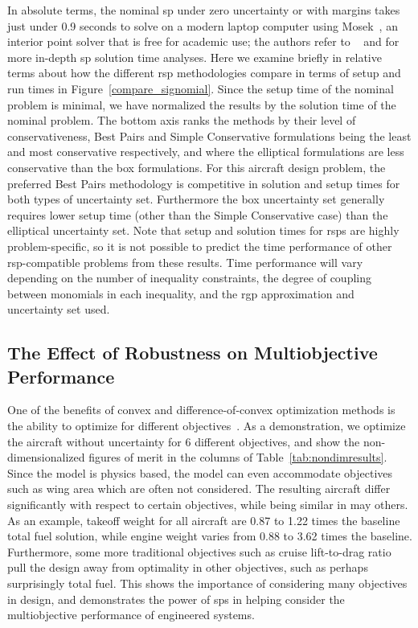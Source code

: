 In absolute
terms, the nominal \gls{sp} under zero uncertainty or with margins
takes just under 0.9 seconds to solve on a modern laptop computer using Mosek~\cite{mosek},
an interior point solver that is free for academic use; the authors
refer to ~\cite{Kirschen2018Log} and \cite{York2018} for more in-depth \gls{sp} solution time analyses.
Here we examine briefly in relative terms about how the different \gls{rsp} methodologies compare in terms of setup and
run times in Figure~\ref{compare_signomial}. Since the setup time of the nominal problem is minimal,
we have normalized the results by the solution time of the nominal problem.
The bottom axis ranks the methods by their level of conservativeness, Best Pairs
and Simple Conservative formulations being the least and most conservative respectively,
and where the elliptical formulations are less conservative than the box formulations.
For this aircraft design problem, the preferred Best Pairs methodology
is competitive in solution and setup times for both types of uncertainty set. Furthermore
the box uncertainty set generally requires lower setup time (other than the Simple Conservative case)
than the elliptical uncertainty set.
Note that setup and solution times for \gls{rsp}s are highly problem-specific, so it is not possible
to predict the time performance of other \gls{rsp}-compatible problems from these results.
Time performance will vary depending on the number of inequality constraints,
the degree of coupling between monomials
in each inequality, and the \gls{rgp} approximation and uncertainty set used.

\subsection{The Effect of Robustness on Multiobjective Performance}

One of the benefits of convex and difference-of-convex optimization methods is the ability to optimize for
different objectives~\cite{York2018}. As a demonstration, we optimize the aircraft without uncertainty
for 6 different objectives, and show
the non-dimensionalized figures of merit in the columns of Table~\ref{tab:nondimresults}.
Since the model is physics based, the model can even accommodate objectives such as wing area
which are often not considered. The resulting aircraft
differ significantly with respect to certain objectives, while being similar in may others.
As an example, takeoff weight for all aircraft are 0.87 to 1.22 times the baseline total fuel solution,
while engine weight varies from 0.88 to 3.62 times the baseline.
Furthermore, some more traditional objectives such as cruise lift-to-drag ratio pull the design
away from optimality in other objectives, such as perhaps surprisingly total fuel.
This shows the importance of considering many objectives
in design, and demonstrates the power of \gls{sp}s in helping
consider the multiobjective performance of engineered systems.

